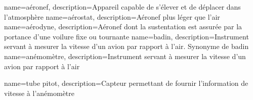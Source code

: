 {
    name=aéronef,
    description={Appareil capable de s'élever et de déplacer dans l'atmosphère}
}
{
    name=aérostat,
    description={Aéronef plus léger que l'air}
}
{
    name=aérodyne,
    description={Aéronef dont la sustentation est assurée par la portance d'une voilure fixe ou tournante}
}
{
    name=badin,
    description={Instrument servant à mesurer la vitesse d'un avion par rapport à l'air. Synonyme de badin}
}
{
    name=anémomètre,
    description={Instrument servant à mesurer la vitesse d'un avion par rapport à l'air}
}

{
    name=tube pitot,
    description={Capteur permettant de fournir l'information de vitesse à l'anémomètre}
}

